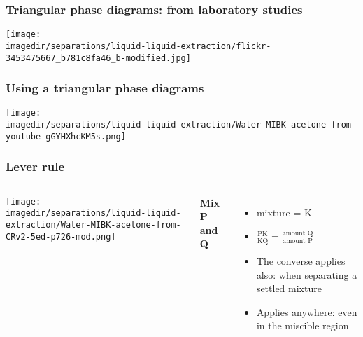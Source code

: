 \begin{frame}\frametitle{Triangular phase diagrams: from laboratory studies}
	\begin{center}
		\texttt{[image: \\imagedir/separations/liquid-liquid-extraction/flickr-3453475667\_b781c8fa46\_b-modified.jpg]}
	\end{center}
	\vspace{-12pt}
\end{frame}

\begin{frame}\frametitle{Using a triangular phase diagrams}
	\begin{center}
		\texttt{[image: \\imagedir/separations/liquid-liquid-extraction/Water-MIBK-acetone-from-youtube-gGYHXhcKM5s.png]}
	\end{center}
	\vspace{-12pt}
\end{frame}

\begin{frame}\frametitle{Lever rule}
	\begin{columns}[t]
			\begin{center}
				\texttt{[image: \\imagedir/separations/liquid-liquid-extraction/Water-MIBK-acetone-from-CRv2-5ed-p726-mod.png]}
			\end{center}
			\textbf{Mix P and Q}
			
			\begin{itemize}
				\item	mixture = K
				\vspace{12pt}
				\item	$\displaystyle \frac{\text{PK}}{\text{KQ}} = \displaystyle\frac{\text{amount Q}}{\text{amount P}}$
				\vspace{12pt}
				\item	The converse applies also: when separating a settled mixture
				\item	Applies anywhere: even in the miscible region
			\end{itemize}
	\end{columns}
\end{frame}

